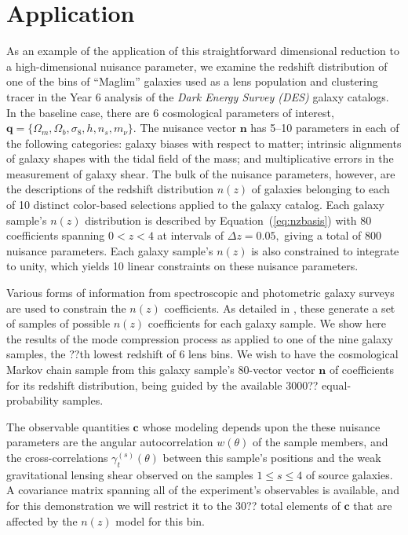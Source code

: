 \documentclass[linenumbers, onecolumn]{aastex63}
\newcommand{\eqq}[1]{Equation~(\ref{#1})}
\newcommand{\vecc}{\ensuremath{\mathbf{c}}}
\newcommand{\vecq}{\ensuremath{\mathbf{q}}}
\newcommand{\vecn}{\ensuremath{\mathbf{n}}}
\begin{document}
\section{Application}\label{sec:app}
As an example of the application of this straightforward dimensional
reduction to a high-dimensional nuisance parameter, we examine the
redshift distribution of one of the bins of ``Maglim''  galaxies used
as a lens population and clustering tracer in the Year 6 analysis of
the \textit{Dark Energy Survey (DES)} galaxy catalogs.  In the baseline case,
there are 6 cosmological parameters of interest, $\vecq = \{\Omega_m,
\Omega_b, \sigma_8, h, n_s, m_\nu\}.$   The nuisance vector $\vecn$
has 5--10 parameters in each of the following categories: galaxy
biases with respect to matter; intrinsic alignments of galaxy shapes
with the tidal field of the mass; and multiplicative errors in the
measurement of galaxy shear.  The bulk of the nuisance parameters,
however, are the descriptions of the redshift distribution $n(z)$ of
galaxies belonging to each of 10 distinct color-based selections
applied to the galaxy catalog. Each galaxy sample's $n(z)$ distribution is
described by \eqq{eq:nzbasis} with 80 coefficients spanning $0<z<4$ at
intervals of $\Delta z=0.05,$  giving a total of 800 nuisance
parameters.  Each galaxy sample's $n(z)$ is also constrained to
integrate to unity, which yields 10 linear constraints on these
nuisance parameters.

Various forms of information from spectroscopic and photometric galaxy
surveys are used to constrain the $n(z)$ coefficients. As detailed in
\citet{y6pz}, these generate a set of samples of possible $n(z)$
coefficients for each galaxy sample.  We show here the results of the
mode compression process as applied to one of the nine galaxy samples,
the ??th lowest redshift of 6 lens bins.  We wish to have the
cosmological Markov chain sample from this
galaxy sample's 80-vector vector $\vecn$ of coefficients for its
redshift distribution, being guided by the available 3000??
equal-probability samples.

The observable quantities $\vecc$ whose modeling depends upon the these nuisance
parameters are the angular autocorrelation $w(\theta)$ of the sample
members, and the cross-correlations $\gamma_t^{(s)}(\theta)$ between
this sample's positions and the weak gravitational lensing shear
observed on the samples $1\le s \le 4$ of source galaxies.  A
covariance matrix spanning all of the experiment's observables is
available, and for this demonstration we will restrict it to the 30??
total elements of $\vecc$ that are affected by the $n(z)$ model for
this bin.
\end{document}
